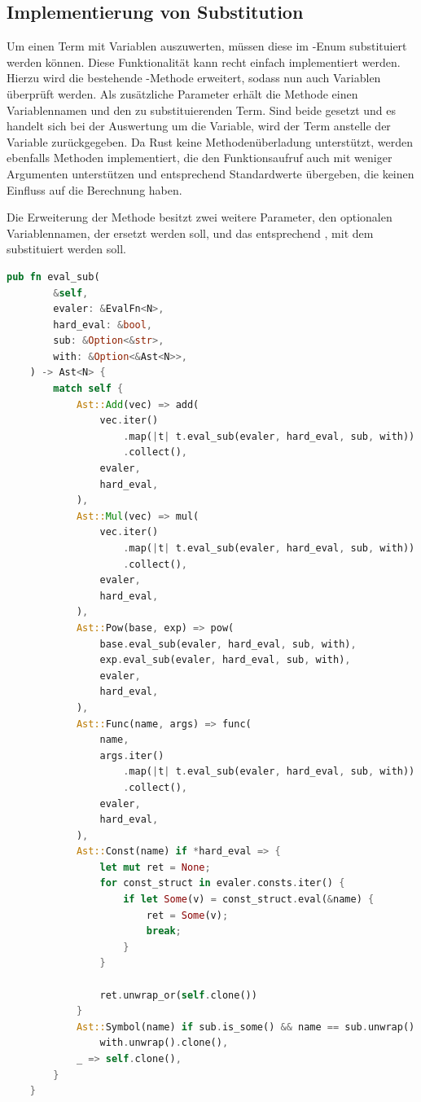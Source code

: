 \documentclass[11pt,a4paper, ngerman]{article}
\begin{document}
\subsection{Implementierung von Substitution} Um einen Term mit Variablen auszuwerten, müssen diese im -Enum substituiert werden können. Diese Funktionalität kann recht einfach implementiert werden. Hierzu wird die bestehende -Methode erweitert, sodass nun auch Variablen überprüft werden. Als zusätzliche Parameter erhält die Methode einen Variablennamen und den zu substituierenden Term. Sind beide gesetzt und es handelt sich bei der Auswertung um die Variable, wird der Term anstelle der Variable zurückgegeben. Da Rust keine Methodenüberladung unterstützt, werden ebenfalls Methoden implementiert, die den Funktionsaufruf auch mit weniger Argumenten unterstützen und entsprechend Standardwerte übergeben, die keinen Einfluss auf die Berechnung haben.

Die Erweiterung der Methode besitzt zwei weitere Parameter, den optionalen Variablennamen, der ersetzt werden soll, und das entsprechend , mit dem substituiert werden soll.
\begin{lstlisting}[language=rust, caption={Erweiterung pub fn eval}]
    pub fn eval_sub(
        &self,
        evaler: &EvalFn<N>,
        hard_eval: &bool,
        sub: &Option<&str>,
        with: &Option<&Ast<N>>,
    ) -> Ast<N> {
        match self {
            Ast::Add(vec) => add(
                vec.iter()
                    .map(|t| t.eval_sub(evaler, hard_eval, sub, with))
                    .collect(),
                evaler,
                hard_eval,
            ),
            Ast::Mul(vec) => mul(
                vec.iter()
                    .map(|t| t.eval_sub(evaler, hard_eval, sub, with))
                    .collect(),
                evaler,
                hard_eval,
            ),
            Ast::Pow(base, exp) => pow(
                base.eval_sub(evaler, hard_eval, sub, with),
                exp.eval_sub(evaler, hard_eval, sub, with),
                evaler,
                hard_eval,
            ),
            Ast::Func(name, args) => func(
                name,
                args.iter()
                    .map(|t| t.eval_sub(evaler, hard_eval, sub, with))
                    .collect(),
                evaler,
                hard_eval,
            ),
            Ast::Const(name) if *hard_eval => {
                let mut ret = None;
                for const_struct in evaler.consts.iter() {
                    if let Some(v) = const_struct.eval(&name) {
                        ret = Some(v);
                        break;
                    }
                }

                ret.unwrap_or(self.clone())
            }
            Ast::Symbol(name) if sub.is_some() && name == sub.unwrap() => 
                with.unwrap().clone(),
            _ => self.clone(),
        }
    }
\end{lstlisting}
\end{document}
